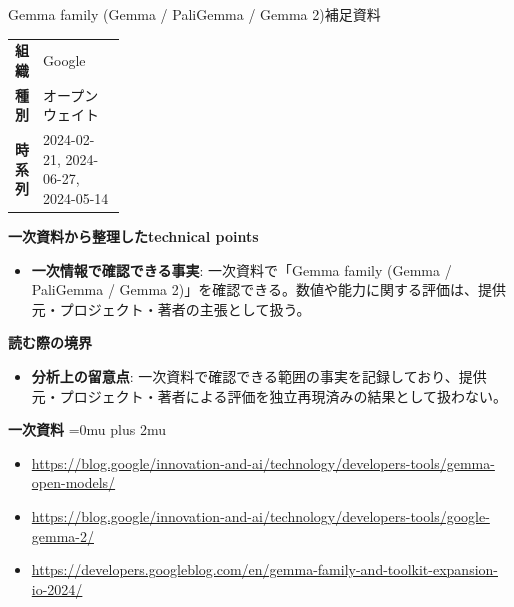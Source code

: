 \begin{technicalnote}{Gemma family (Gemma / PaliGemma / Gemma 2)}{補足資料}
\begingroup
\begin{tabularx}{\linewidth}{@{}>{\bfseries}p{0.22\linewidth}X@{}}
組織 & Google \\
種別 & オープンウェイト \\
時系列 & 2024-02-21, 2024-06-27, 2024-05-14 \\
\end{tabularx}
\smallskip
{\bfseries 一次資料から整理したtechnical points}
\begin{itemize}[leftmargin=1.5em,itemsep=0.35em]
\item \textbf{一次情報で確認できる事実}: 一次資料で「Gemma family (Gemma / PaliGemma / Gemma 2)」を確認できる。数値や能力に関する評価は、提供元・プロジェクト・著者の主張として扱う。
\end{itemize}
\begin{minipage}{\linewidth}
{\bfseries 読む際の境界}
\begin{itemize}[leftmargin=1.5em,itemsep=0.35em]
\item \textbf{分析上の留意点}: 一次資料で確認できる範囲の事実を記録しており、提供元・プロジェクト・著者による評価を独立再現済みの結果として扱わない。
\end{itemize}
\begin{samepage}
{\bfseries 一次資料}
\begingroup\sloppy
\Urlmuskip=0mu plus 2mu\relax
\begin{itemize}[leftmargin=1.5em,itemsep=0.25em]
\item {\scriptsize\url{https://blog.google/innovation-and-ai/technology/developers-tools/gemma-open-models/}}
\item {\scriptsize\url{https://blog.google/innovation-and-ai/technology/developers-tools/google-gemma-2/}}
\item {\scriptsize\url{https://developers.googleblog.com/en/gemma-family-and-toolkit-expansion-io-2024/}}
\end{itemize}
\endgroup
\end{samepage}
\end{minipage}
\endgroup
\end{technicalnote}
\medskip

